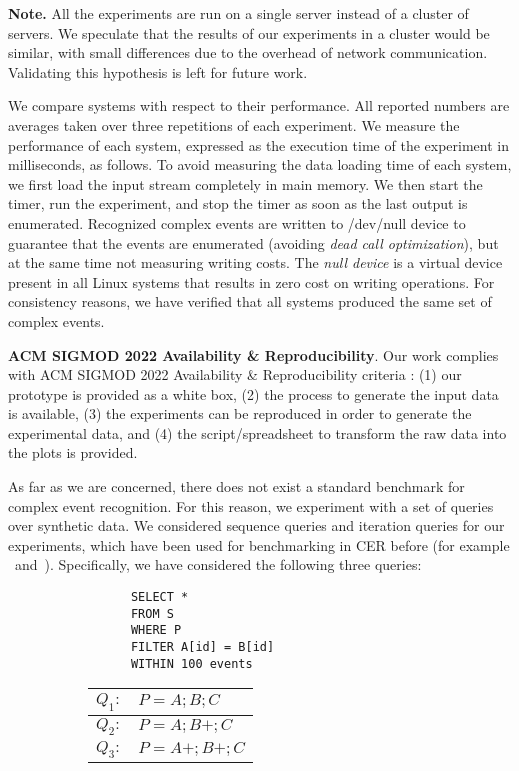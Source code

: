 \textbf{Note.} All the experiments are run on a single server instead of a cluster of servers. We speculate that the results of our experiments in a cluster would be similar, with small differences due to the overhead of network communication. Validating this hypothesis is left for future work.

We compare systems with respect to their performance. All reported numbers are averages taken over three repetitions of each experiment. We measure the performance of each system, expressed as the execution time of the experiment in milliseconds, as follows. To avoid measuring the data loading time of each system, we first load the input stream completely in main memory. We then start the timer, run the experiment, and stop the timer as soon as the last output is enumerated. Recognized complex events are written to /dev/null device to guarantee that the events are enumerated (avoiding \emph{dead call optimization}), but at the same time not measuring writing costs. The \emph{null device} is a virtual device present in all Linux systems that results in zero cost on writing operations. For consistency reasons, we have verified that all systems produced the same set of complex events.

\textbf{ACM SIGMOD 2022 Availability \& Reproducibility}. Our work complies with ACM SIGMOD 2022 Availability \& Reproducibility criteria \cite{acm-reprodocubility} : (1) our prototype is provided as a white box, (2) the process to generate the input data is available, (3) the experiments can be reproduced in order to generate the experimental data, and (4) the script/spreadsheet to transform the raw data into the plots is provided.

As far as we are concerned, there does not exist a standard benchmark for complex event recognition. For this reason, we experiment with a set of queries over synthetic data. We considered sequence queries and iteration queries for our experiments, which have been used for benchmarking in CER before (for example \cite{cayuga}~and~\cite{experiment-example}). Specifically, we have considered the following three queries:

\begin{figure}[H]
  \centering
  \begin{subfigure}[c]{0.49\textwidth}
    \centering
    \begin{verbatim}
      SELECT *
      FROM S
      WHERE P
      FILTER A[id] = B[id]
      WITHIN 100 events
    \end{verbatim}
  \end{subfigure}
  \begin{subfigure}[t]{0.49\textwidth}
    \begin{tabular}{l l}
      \hline
      $Q_{1}:$ & $P = A;B;C$ \\
      \hline
      $Q_{2}:$ & $P = A;B+;C$ \\
      \hline
      $Q_{3}:$ & $P = A+;B+;C$ \\
      \hline
    \end{tabular}
  \end{subfigure}
\end{figure}

